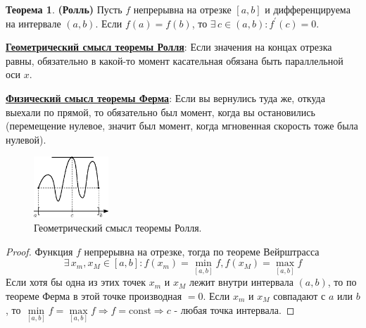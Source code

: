 \documentclass[12pt]{article}
\theoremstyle{definition}
\newtheorem{theorem}{Теорема}
\begin{document}
\begin{theorem}\textbf{(Ролль)}
	Пусть $f$ непрерывна на отрезке $[a,b]$ и дифференцируема на интервале $(a,b)$. Если $f(a) = f(b)$, то $\exists \, c \in (a,b) \colon f^\prime(c) = 0$.
\end{theorem}
\uline{\textbf{Геометрический смысл теоремы Ролля}}: Если значения на концах отрезка равны, обязательно в какой-то момент касательная обязана быть параллельной оси $x$.

\uline{\textbf{Физический смысл теоремы Ферма}}: Если вы вернулись туда же, откуда выехали по прямой, то обязательно был момент, когда вы остановились (перемещение нулевое, значит был момент, когда мгновенная скорость тоже была нулевой).

\begin{figure}[H]
	\centering
	\includegraphics[width=0.25\textwidth]{23_3.eps}
	\caption{Геометрический смысл теоремы Ролля.}
	\label{23_3}
\end{figure}

\begin{proof}
	Функция $f$ непрерывна на отрезке, тогда по теореме Вейрштрасса 
	$$\exists \, x_m, x_M \in [a,b] \colon f(x_m) = \min\limits_{[a,b]}{f}, f(x_M) = \max\limits_{[a,b]}{f}$$
	Если хотя бы одна из этих точек $x_m$ и $x_M$ лежит внутри интервала $(a,b)$, то по теореме Ферма в этой точке производная $= 0$. Если $x_m$ и $x_M$ совпадают с $a$ или $b$, то $\min\limits_{[a,b]}{f} = \max\limits_{[a,b]}{f} \Rightarrow f = \text{const} \Rightarrow c$ - любая точка интервала.
\end{proof}
\end{document}
